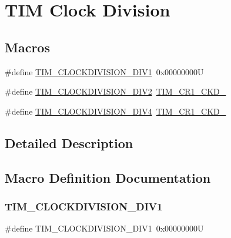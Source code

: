 \hypertarget{group___t_i_m___clock_division}{}\section{T\+IM Clock Division}
\label{group___t_i_m___clock_division}
\subsection*{Macros}
\begin{DoxyCompactItemize}
\item 
\#define \mbox{\hyperlink{group___t_i_m___clock_division_ga309297ccd407a836ede6a42d4dc479c1}{T\+I\+M\+\_\+\+C\+L\+O\+C\+K\+D\+I\+V\+I\+S\+I\+O\+N\+\_\+\+D\+I\+V1}}~0x00000000U
\item 
\#define \mbox{\hyperlink{group___t_i_m___clock_division_gaf84a16da8edb80a3d8af91fbfc046181}{T\+I\+M\+\_\+\+C\+L\+O\+C\+K\+D\+I\+V\+I\+S\+I\+O\+N\+\_\+\+D\+I\+V2}}~\mbox{\hyperlink{group___peripheral___registers___bits___definition_ga458d536d82aa3db7d227b0f00b36808f}{T\+I\+M\+\_\+\+C\+R1\+\_\+\+C\+K\+D\+\_}}
\item 
\#define \mbox{\hyperlink{group___t_i_m___clock_division_ga7cac7491610ffc135ea9ed54f769ddbc}{T\+I\+M\+\_\+\+C\+L\+O\+C\+K\+D\+I\+V\+I\+S\+I\+O\+N\+\_\+\+D\+I\+V4}}~\mbox{\hyperlink{group___peripheral___registers___bits___definition_ga7ff2d6c2c350e8b719a8ad49c9a6bcbe}{T\+I\+M\+\_\+\+C\+R1\+\_\+\+C\+K\+D\+\_}}
\end{DoxyCompactItemize}


\subsection{Detailed Description}


\subsection{Macro Definition Documentation}
\mbox{\label{group___t_i_m___clock_division_ga309297ccd407a836ede6a42d4dc479c1}} 
\subsubsection{\texorpdfstring{TIM\_CLOCKDIVISION\_DIV1}{TIM\_CLOCKDIVISION\_DIV1}}
{\footnotesize\ttfamily \#define T\+I\+M\+\_\+\+C\+L\+O\+C\+K\+D\+I\+V\+I\+S\+I\+O\+N\+\_\+\+D\+I\+V1~0x00000000U}

